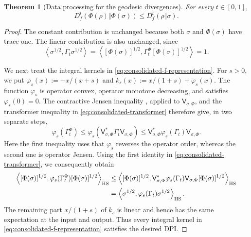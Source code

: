 \documentclass[11pt]{article}
\newtheorem{theorem}[theorem]{Theorem}
\theoremstyle{remark}
\newcommand{\1}{\mathbbm{1}}
\begin{document}
\begin{theorem}[Data processing for the geodesic divergences]
\label{thm:consolidated-dpi}
For every $t\in[0,1]$,
\begin{equation}
 D_f^t(\Phi(\rho)\Vert\Phi(\sigma))
 \leq D_f^t(\rho\Vert\sigma).
 \label{eq:consolidated-dpi}
\end{equation}
\end{theorem}

\begin{proof}
The constant contribution is unchanged because both $\sigma$ and
$\Phi(\sigma)$ have trace one.  The linear contribution is also
unchanged, since
\begin{equation}
 \left\langle\sigma^{1/2},\Gamma_t\sigma^{1/2}\right\rangle
 =\left\langle[\Phi(\sigma)]^{1/2},
 \Gamma_t^\Phi[\Phi(\sigma)]^{1/2}\right\rangle=1.
\end{equation}

We next treat the integral kernels in
\eqref{eq:consolidated-f-representation}.  For $s>0$, we put
$\varphi_s(x):=-x/(x+s)$ and
$k_s(x):=x/(1+s)+\varphi_s(x)$.  The function $\varphi_s$ is operator convex,
operator monotone decreasing, and satisfies $\varphi_s(0)=0$.
The contractive Jensen inequality
\cite[Corollary~2.3]{hansen2003jensen}, applied to
$\mathsf V_{\sigma,\Phi}$, and the transformer inequality in
\eqref{eq:consolidated-transformer} therefore give, in two separate
steps,
\begin{equation}
 \varphi_s(\Gamma_t^\Phi)
 \leq\varphi_s\!\left(
       \mathsf V_{\sigma,\Phi}^*\Gamma_t
       \mathsf V_{\sigma,\Phi}\right)
 \leq\mathsf V_{\sigma,\Phi}^*\varphi_s(\Gamma_t)
       \mathsf V_{\sigma,\Phi}.
\end{equation}
Here the first inequality uses that $\varphi_s$ reverses the operator
order, whereas the second one is operator Jensen.  Using the first
identity in \eqref{eq:consolidated-transformer}, we consequently obtain
\begin{align*}
 \left\langle[\Phi(\sigma)]^{1/2},
   \varphi_s(\Gamma_t^\Phi)[\Phi(\sigma)]^{1/2}\right\rangle_{\rm HS}
&\leq
 \left\langle[\Phi(\sigma)]^{1/2},
   \mathsf V_{\sigma,\Phi}^*\varphi_s(\Gamma_t)
   \mathsf V_{\sigma,\Phi}[\Phi(\sigma)]^{1/2}
 \right\rangle_{\rm HS}\\
 &=
 \left\langle\sigma^{1/2},
   \varphi_s(\Gamma_t)\sigma^{1/2}\right\rangle_{\rm HS}.
\end{align*}
The remaining part $x/(1+s)$ of $k_s$ is linear and hence has
the same expectation at the input and output.  Thus every integral
kernel in \eqref{eq:consolidated-f-representation} satisfies the
desired DPI.


\end{proof}
\end{document}
